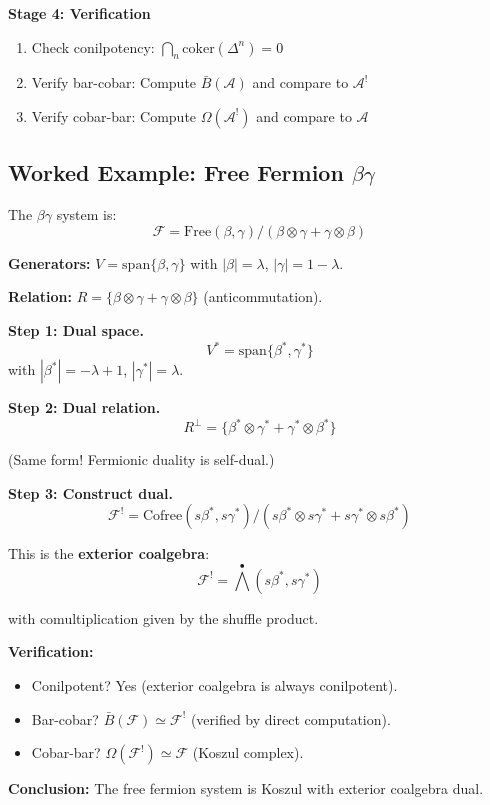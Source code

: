 \begin{procedure}
\textbf{Stage 4: Verification}
\begin{enumerate}
\item Check conilpotency: $\bigcap_n \text{coker}(\Delta^n) = 0$
\item Verify bar-cobar: Compute $\bar{B}(\mathcal{A})$ and compare to $\mathcal{A}^!$
\item Verify cobar-bar: Compute $\Omega(\mathcal{A}^!)$ and compare to $\mathcal{A}$
\end{enumerate}
\end{procedure}

\subsection{Worked Example: Free Fermion $\beta\gamma$}

\begin{example}\label{ex:free-fermion-koszul-dual}
The $\beta\gamma$ system is:
$$\mathcal{F} = \text{Free}(\beta, \gamma) / (\beta \otimes \gamma + \gamma \otimes \beta)$$

\textbf{Generators:} $V = \text{span}\{\beta, \gamma\}$ with $|\beta| = \lambda$, 
$|\gamma| = 1 - \lambda$.

\textbf{Relation:} $R = \{\beta \otimes \gamma + \gamma \otimes \beta\}$ (anticommutation).

\textbf{Step 1: Dual space.}
$$V^* = \text{span}\{\beta^*, \gamma^*\}$$
with $|\beta^*| = -\lambda + 1$, $|\gamma^*| = \lambda$.

\textbf{Step 2: Dual relation.}
$$R^\perp = \{\beta^* \otimes \gamma^* + \gamma^* \otimes \beta^*\}$$

(Same form! Fermionic duality is self-dual.)

\textbf{Step 3: Construct dual.}
$$\mathcal{F}^! = \text{Cofree}(s\beta^*, s\gamma^*) / (s\beta^* \otimes s\gamma^* 
+ s\gamma^* \otimes s\beta^*)$$

This is the \textbf{exterior coalgebra}:
$$\mathcal{F}^! = \bigwedge^\bullet(s\beta^*, s\gamma^*)$$

with comultiplication given by the shuffle product.

\textbf{Verification:}
\begin{itemize}
\item Conilpotent? Yes (exterior coalgebra is always conilpotent).
\item Bar-cobar? $\bar{B}(\mathcal{F}) \simeq \mathcal{F}^!$ (verified by direct computation).
\item Cobar-bar? $\Omega(\mathcal{F}^!) \simeq \mathcal{F}$ (Koszul complex).
\end{itemize}

\textbf{Conclusion:} The free fermion system is Koszul with exterior coalgebra dual.
\end{example}

